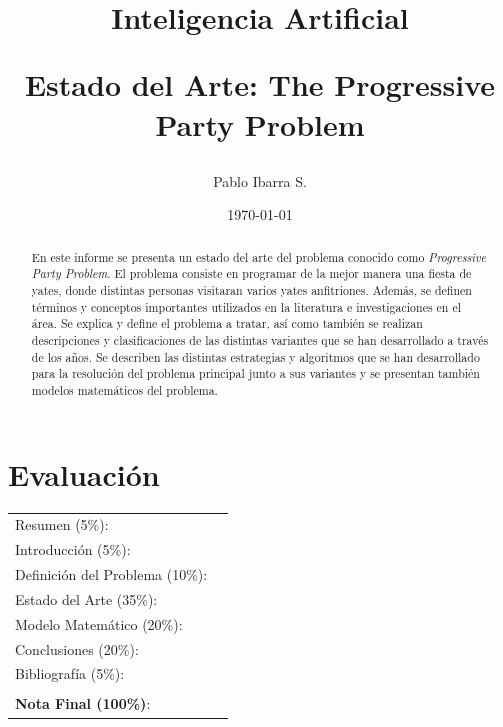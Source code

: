 \documentclass[spanish, fleqn]{article}
\begin{document}
\title{Inteligencia Artificial \\ \begin{Large}Estado del Arte: The Progressive Party Problem\end{Large}}
\author{Pablo Ibarra S.}
\date{\today}
\maketitle

\section*{Evaluación}

\begin{tabular}{ll}
Resumen (5\%): & \underline{\hspace{2cm}} \\
Introducción (5\%):  & \underline{\hspace{2cm}} \\
Definición del Problema (10\%):  & \underline{\hspace{2cm}} \\
Estado del Arte (35\%):  & \underline{\hspace{2cm}} \\
Modelo Matemático (20\%): &  \underline{\hspace{2cm}}\\
Conclusiones (20\%): &  \underline{\hspace{2cm}}\\
Bibliografía (5\%): & \underline{\hspace{2cm}}\\
 &  \\
\textbf{Nota Final (100\%)}:   & \underline{\hspace{2cm}}
\end{tabular}

\begin{abstract}
En este informe se presenta un estado del arte del problema conocido como \textit{Progressive Party Problem}. El problema consiste en programar de la mejor manera una fiesta de yates, donde distintas personas visitaran varios yates anfitriones. Además, se definen términos y conceptos importantes utilizados en la literatura e investigaciones en el área. Se explica y define el problema a tratar, así como también se realizan descripciones y clasificaciones de las distintas variantes que se han desarrollado a través de los años. Se describen las distintas estrategias y algoritmos que se han desarrollado para la resolución del problema principal junto a sus variantes y se presentan también modelos matemáticos del problema.

\end{abstract}
\end{document}
